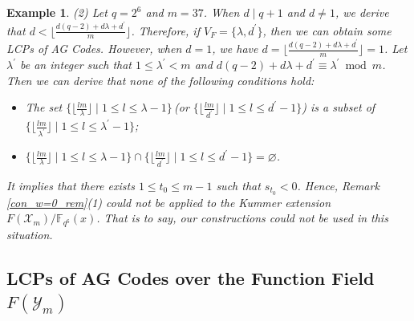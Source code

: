 \documentclass[journal,12pt,onecolumn]{IEEEtran}
\newtheorem{example}[theorem]{Example}
\begin{document}
\begin{example}
    {\rm (2)} Let $q = 2^6$ and $m = 37$. When $d \mid q+1$ and $d\neq 1$, we derive that $d<\big\lfloor \frac{d(q-2)+d\lambda+d^\prime}{m} \big\rfloor$. Therefore, if $V_F = \{\lambda,d^\prime\}$, then we can obtain some LCPs of AG Codes. However, when $d = 1$, we have $d=\big\lfloor \frac{d(q-2)+d\lambda+d^\prime}{m} \big\rfloor = 1$. Let $\lambda^\prime$ be an integer such that $1\le \lambda^\prime<m$ and $d(q-2)+d\lambda+d^\prime \equiv \lambda^\prime\bmod m$. Then we can derive that none of the following conditions hold: 
    \begin{itemize}
        \item The set $\big\{\big\lfloor\frac{l m}{\lambda}\big\rfloor\mid 1\le l\le \lambda-1\big\}$\,\big(or $\big\{\big\lfloor\frac{l m}{d^\prime}\big\rfloor\mid 1\le l\le d^\prime-1\big\}$\big) is a subset of $\big\{\big\lfloor\frac{l m}{\lambda^\prime}\big\rfloor\mid 1\le l\le \lambda^\prime-1\big\}$;
        \item $\big\{\big\lfloor\frac{l m}{\lambda}\big\rfloor\mid 1\le l\le \lambda-1\big\}\cap \big\{\big\lfloor\frac{l m}{d^\prime}\big\rfloor\mid 1\le l\le d^\prime-1\big\} = \varnothing$. 
    \end{itemize}
    It implies that there exists $1\le t_0\le m-1$ such that $s_{t_0}<0$. Hence, Remark \ref{con_w=0_rem}(1) could not be applied to the Kummer extension $F(\mathcal{X}_m)/\mathbb{F}_{q^6}(x)$. That is to say, our constructions could not be used in this situation. 
\end{example}






\subsection{LCPs of AG Codes over the Function Field $F(\mathcal{Y}_m)$} 
\end{document}
